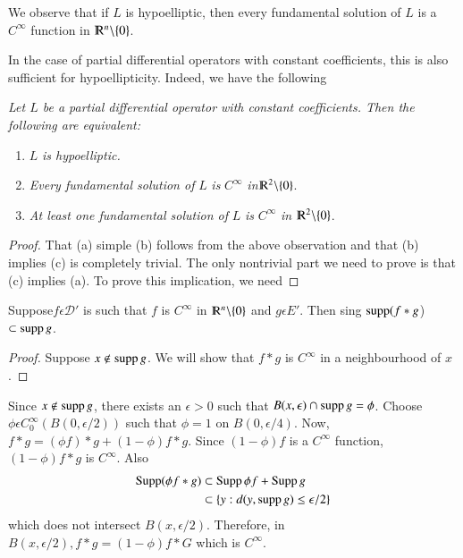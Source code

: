 We observe that if $L$ is hypoelliptic, then every fundamental
solution of $L$ is a $C^{\infty}$ function in $\varmathbb{R}^n
\backslash \{0\}$. 

In the case of partial differential operators with constant
coefficients, this is also sufficient for hypoellipticity. Indeed, we
have the following  
\setcounter{thm}{10}
\begin{thm} \label{chap2:sec2:thm2.11}%
 \em{Let $L$ be a partial differential operator with constant
   coefficients. Then the following are equivalent:} 
 \begin{enumerate}[\rm a)]
 \item $L$ \textit{is hypoelliptic.}
 \item \textit{Every fundamental solution of } $L$ \textit{is } $
   C^{\infty}$ \textit{in}$ \varmathbb{R}^2 \backslash \{0\}$. 
 \item \textit{At least one fundamental solution of }$L$ \textit{is }
   $C^{\infty}$ \textit{in } $\varmathbb{R}^2 \backslash\{0\}$. 
 \end{enumerate} 
\end{thm}

\begin{proof}
  That (a)
  simple (b) follows from the above observation and that
  (b) implies (c) is completely trivial. The only nontrivial part we
  need to prove is that (c) implies (a). To prove this implication,
  we need 
\end{proof}

\setcounter{lem}{11}
\begin{lem} \label{chap2:sec2:lem2.12}%
  Suppose\pageoriginale $f \epsilon \mathcal{D}'$ is such that 
  $f$ is  $C^{\infty}$ in  $\varmathbb{R}^n \backslash
  \{0\}$ and  $ g \epsilon E'$. Then sing $\operatorname{supp}(f
  * g$) $\subset \operatorname{supp} g$.  
\end{lem}

\begin{proof}
  Suppose $x \notin  \operatorname{supp} g$. We will show that $f * g $ is
  $C^{\infty}$ in a neighbourhood of $x$. 
\end{proof}

Since $x \notin \operatorname{supp} g$, there exists an $ \epsilon > 0$ such that
$B(x, \epsilon ) \cap  \operatorname{supp} g = \phi$. Choose $\phi \epsilon
C_0 ^{\infty} (B (0, \epsilon / 2))$ such that $\phi =1$ on $B(0,
\epsilon /4)$. Now, $f *g = ( \phi f) * g + (1 - \phi)f * g$. Since
$(1 - \phi ) f $ is a $C^{\infty}$ function, $(1- \phi) f * g$
is $C^{\infty}$. Also 
\begin{align*}
  \operatorname{Supp} ( \phi f * g ) & \subset \operatorname{Supp} \phi f + \operatorname{Supp} g\\
  & \subset\{ y : d(y,\operatorname{supp} g) \leq \epsilon / 2\}
\end{align*}
which does not intersect $B(x, \epsilon /2)$. Therefore, in $B(x,
\epsilon /2), f*g = (1- \phi ) f*G$ which is $C^{\infty}$. 

